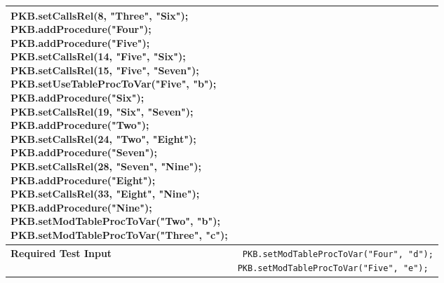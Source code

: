 \documentclass[12pt]{article}
\begin{document}
{{{{{{{{{{{{{\begin{longtable}{|L{5cm} | L{12cm}| }
{	\hspace{9mm} PKB.setCallsRel(8, "Three", "Six");  \newline
    \hspace{9mm} PKB.addProcedure("Four"); \newline
	\hspace{9mm} PKB.addProcedure("Five"); \newline
	\hspace{9mm} PKB.setCallsRel(14, "Five", "Six"); \newline
	\hspace{9mm} PKB.setCallsRel(15, "Five", "Seven"); \newline
	\hspace{9mm} PKB.setUseTableProcToVar("Five", "b"); \newline
	\hspace{9mm} PKB.addProcedure("Six"); \newline
	\hspace{9mm} PKB.setCallsRel(19, "Six", "Seven"); \newline
	\hspace{9mm} PKB.addProcedure("Two"); \newline
	\hspace{9mm} PKB.setCallsRel(24, "Two", "Eight"); \newline
	\hspace{9mm} PKB.addProcedure("Seven"); \newline
	\hspace{9mm} PKB.setCallsRel(28, "Seven", "Nine"); \newline
	\hspace{9mm} PKB.addProcedure("Eight"); \newline
	\hspace{9mm} PKB.setCallsRel(33, "Eight", "Nine"); \newline
	\hspace{9mm} PKB.addProcedure("Nine"); \newline
	\hspace{9mm} PKB.setModTableProcToVar("Two", "b"); \newline
	\hspace{9mm} PKB.setModTableProcToVar("Three", "c"); }
    \\\hline
\textbf{Required Test Input}
 & \texttt{
	\hspace{7mm} PKB.setModTableProcToVar("Four", "d"); \newline
	\hspace{9mm} PKB.setModTableProcToVar("Five", "e"); \newline
}
\end{longtable}}}}}}}}}}}}}}
\end{document}
